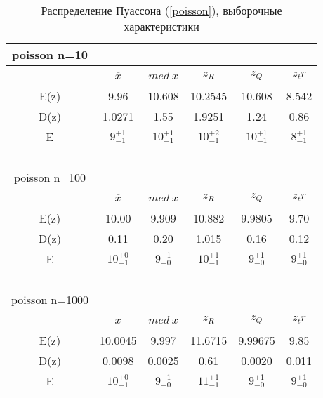 \documentclass[12pt,a4paper]{article}
\begin{document}
			\begin{table}[htp]
				\label{tabular:poisson}
				\begin{center}
					\begin{tabular}{|c|c|c|c|c|c|} 
						
						\hline
						poisson n=10 & \ & \ & \ & \ & \ \\ \hline
						\ & $\overline{x}$ & $med \ x$ & $z_R$ & $z_Q$ & $z_tr$ \\ \hline
						E(z) & 9.96 & 10.608 & 10.2545 & 10.608 & 8.542 \\ \hline
						D(z) & 1.0271  & 1.55 & 1.9251 &  1.24  &  0.86 \\ \hline
						E & $9^{+1}_{-1}$ & $10^{+1}_{-1}$ & $10^{+2}_{-1}$ & $10^{+1}_{-1}$ & $8^{+1}_{-1}$\\\hline
						\ & \ & \ & \ & \ & \ \\ \hline
						
						poisson n=100 & \ & \ & \ & \ & \ \\ \hline
						\ & $\overline{x}$ & $med \ x$  & $z_R$  & $z_Q$  & $z_tr$ \\ \hline
						E(z) & 10.00 & 9.909 &  10.882 & 9.9805 & 9.70 \\ \hline
						D(z) & 0.11   & 0.20 & 1.015 &  0.16 & 0.12 \\ \hline
						E & $10^{+0}_{-1}$ & $9^{+1}_{-0}$ & $10^{+1}_{-1}$ & $9^{+1}_{-0}$ & $9^{+1}_{-0}$\\\hline
						\ & \ & \ & \ & \ & \ \\ \hline
						
						poisson n=1000 & \ & \ & \ & \ & \ \\ \hline
						\ & $\overline{x}$ & $med \ x$  & $z_R$  & $z_Q$  & $z_tr$ \\ \hline
						E(z) & 10.0045 & 9.997 &  11.6715 & 9.99675 & 9.85 \\ \hline
						D(z) & 0.0098   & 0.0025 & 0.61 &  0.0020  &  0.011 \\ \hline
						E & $10^{+0}_{-1}$ & $9^{+1}_{-0}$ & $11^{+1}_{-1}$ & $9^{+1}_{-0}$ & $9^{+1}_{-0}$ \\\hline
						
					\end{tabular}
				\end{center}
				\caption{Распределение Пуассона (\ref{poisson}), выборочные характеристики}
			\end{table}
			
\end{document}
